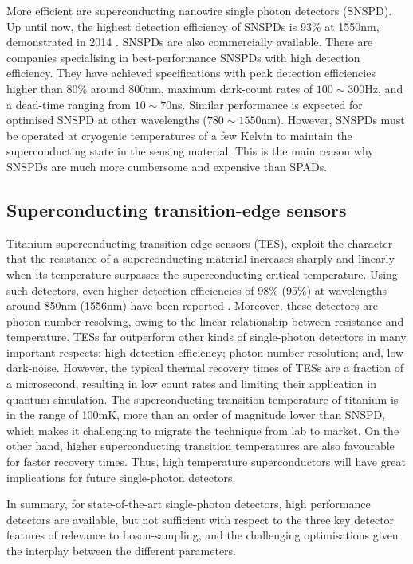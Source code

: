 \documentclass[aps,rmp,twocolumn,amsmath,amssymb,nofootinbib,superscriptaddress]{revtex4}
\begin{document}
More efficient are superconducting nanowire single photon detectors (SNSPD). Up until now, the highest detection efficiency of SNSPDs is 93\% at 1550nm, demonstrated in 2014 \cite{bib:87}. SNSPDs are also commercially available. There are companies specialising in best-performance SNSPDs with high detection efficiency. They have achieved specifications with peak detection efficiencies higher than 80\% around 800nm, maximum dark-count rates of $100\sim 300$Hz, and a dead-time ranging from $10\sim 70$ns. Similar performance is expected for optimised SNSPD at other wavelengths ($780\sim 1550$nm). However, SNSPDs must be operated at cryogenic temperatures of a few Kelvin to maintain the superconducting state in the sensing material. This is the main reason why SNSPDs are much more cumbersome and expensive than SPADs.

\subsection{Superconducting transition-edge sensors}

Titanium superconducting transition edge sensors (TES), exploit the character that the resistance of a superconducting material increases sharply and linearly when its temperature surpasses the superconducting critical temperature. Using such detectors, even higher detection efficiencies of 98\% (95\%) at wavelengths around 850nm (1556nm) have been reported \cite{bib:88, bib:75}. Moreover, these detectors are photon-number-resolving, owing to the linear relationship between resistance and temperature. TESs far outperform other kinds of single-photon detectors in many important respects: high detection efficiency; photon-number resolution; and, low dark-noise. However, the typical thermal recovery times of TESs are a fraction of a microsecond, resulting in low count rates and limiting their application in quantum simulation. The superconducting transition temperature of titanium is in the range of 100mK, more than an order of magnitude lower than SNSPD, which makes it challenging to migrate the technique from lab to market. On the other hand, higher superconducting transition temperatures are also favourable for faster recovery times. Thus, high temperature superconductors will have great implications for future single-photon detectors.

In summary, for state-of-the-art single-photon detectors, high performance detectors are available, but not sufficient with respect to the three key detector features of relevance to boson-sampling, and the challenging optimisations given the interplay between the different parameters.
\end{document}

